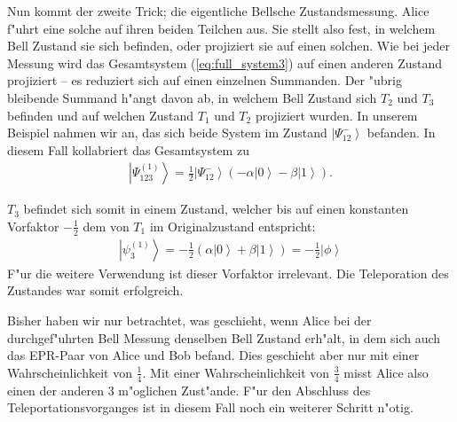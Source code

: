 \begin{refsection}
Nun kommt der zweite Trick; die eigentliche Bellsche Zustandsmessung. Alice f"uhrt eine solche auf ihren beiden Teilchen aus. Sie stellt also fest, in welchem Bell Zustand sie sich befinden, oder projiziert sie auf einen solchen. Wie bei jeder Messung wird das Gesamtsystem (\ref{eq:full_system3}) auf einen anderen Zustand projiziert -- es reduziert sich auf einen einzelnen Summanden. Der "ubrig bleibende Summand h"angt davon ab, in welchem Bell Zustand sich $T_{2}$ und $T_{3}$ befinden und auf welchen Zustand $T_{1}$ und $T_{2}$ projiziert wurden. In unserem Beispiel nahmen wir an, das sich beide System im Zustand $\left|\Psi_{12}^{-}\right\rangle$ befanden. In diesem Fall kollabriert das Gesamtsystem zu
\begin{align}
\left| \Psi_{123}^{(1)} \right\rangle = \frac{1}{2} \left| \Psi_{12}^{-} \right \rangle (-\alpha \left| 0 \right \rangle - \beta \left| 1 \right\rangle).
\end{align}

$T_{3}$ befindet sich somit in einem Zustand, welcher bis auf einen konstanten Vorfaktor $-\frac{1}{2}$ dem von $T_{1}$ im Originalzustand entspricht:
\begin{align}
\left| \psi_{3}^{(1)} \right\rangle = - \frac{1}{2} \left( \alpha \left| 0 \right \rangle + \beta \left| 1 \right \rangle \right ) = - \frac{1}{2} \left| \phi \right \rangle
\end{align}
F"ur die weitere Verwendung ist dieser Vorfaktor irrelevant. Die Teleporation des Zustandes war somit erfolgreich. 

Bisher haben wir  nur betrachtet, was geschieht, wenn Alice bei der durchgef"uhrten Bell Messung denselben Bell Zustand erh"alt, in dem sich auch das EPR-Paar von Alice und Bob befand. Dies geschieht aber nur mit einer Wahrscheinlichkeit von $\frac{1}{4}$. Mit einer Wahrscheinlichkeit von $\frac{3}{4}$ misst Alice also einen der anderen 3 m"oglichen Zust"ande. F"ur den Abschluss des Teleportationsvorganges ist in diesem Fall noch ein weiterer Schritt n"otig.


\end{refsection}
